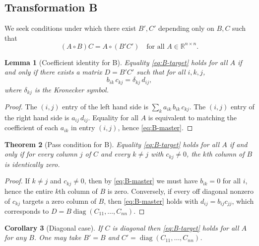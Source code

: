 \documentclass[11pt,a4paper]{article}
\newtheorem{theorem}{Theorem}[section]
\newtheorem{lemma}[theorem]{Lemma}
\newtheorem{corollary}[theorem]{Corollary}
\theoremstyle{definition}
\newcommand{\R}{\mathbb{R}}
\newcommand{\Had}{\circ}
\newcommand{\diag}{\operatorname{diag}}
\begin{document}
\subsection{Transformation B}
We seek conditions under which there exist $B',C'$ depending only on $B,C$ such that
\begin{equation}\label{eq:B-target}
(A\Had B)C = A\Had (B' C') \quad \text{for all } A\in\R^{n\times n}.
\end{equation}

\begin{lemma}[Coefficient identity for B]\label{lem:B-coeff}
Equality \eqref{eq:B-target} holds for all $A$ if and only if there exists a matrix $D=B' C'$ such that for all $i,k,j$,
\begin{equation}\label{eq:B-master}
b_{i k}\,c_{k j} = \delta_{k j}\, d_{i j},
\end{equation}
where $\delta_{k j}$ is the Kronecker symbol.
\end{lemma}

\begin{proof}
The $(i,j)$ entry of the left hand side is $\sum_k a_{i k}\,b_{i k}\,c_{k j}$. The $(i,j)$ entry of the right hand side is $a_{i j}\,d_{i j}$. Equality for all $A$ is equivalent to matching the coefficient of each $a_{i k}$ in entry $(i,j)$, hence \eqref{eq:B-master}.
\end{proof}

\begin{theorem}[Pass condition for B]\label{thm:B-pass}
Equality \eqref{eq:B-target} holds for all $A$ if and only if for every column $j$ of $C$ and every $k\ne j$ with $c_{k j}\ne 0$, the $k$th column of $B$ is identically zero.
\end{theorem}

\begin{proof}
If $k\ne j$ and $c_{k j}\ne 0$, then by \eqref{eq:B-master} we must have $b_{i k}=0$ for all $i$, hence the entire $k$th column of $B$ is zero. Conversely, if every off diagonal nonzero of $c_{k j}$ targets a zero column of $B$, then \eqref{eq:B-master} holds with $d_{i j}=b_{i j} c_{j j}$, which corresponds to $D=B\diag(C_{11},\dots,C_{n n})$.
\end{proof}

\begin{corollary}[Diagonal case]\label{cor:B-diag}
If $C$ is diagonal then \eqref{eq:B-target} holds for all $A$ for any $B$. One may take $B'=B$ and $C'=\diag(C_{11},\dots,C_{n n})$.
\end{corollary}
\end{document}
